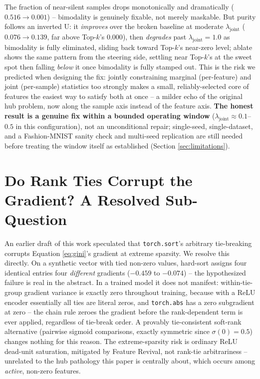 \documentclass[11pt,twocolumn]{article}
\begin{document}
The fraction of near-silent samples drops monotonically and dramatically ($0.516\to0.001$) -- bimodality is genuinely fixable, not merely maskable. But purity follows an inverted U: it \emph{improves} over the broken baseline at moderate $\lambda_{\mathrm{joint}}$ ($0.076\to0.139$, far above Top-$k$'s $0.000$), then \emph{degrades} past $\lambda_{\mathrm{joint}}{=}1.0$ as bimodality is fully eliminated, sliding back toward Top-$k$'s near-zero level; ablate shows the same pattern from the steering side, settling near Top-$k$'s at the sweet spot then falling \emph{below} it once bimodality is fully stamped out. This is the risk we predicted when designing the fix: jointly constraining marginal (per-feature) and joint (per-sample) statistics too strongly makes a small, reliably-selected core of features the easiest way to satisfy both at once -- a milder echo of the original hub problem, now along the sample axis instead of the feature axis. \textbf{The honest result is a genuine fix within a bounded operating window} ($\lambda_{\mathrm{joint}}\approx0.1$--$0.5$ in this configuration), not an unconditional repair; single-seed, single-dataset, and a Fashion-MNIST sanity check and multi-seed replication are still needed before treating the window itself as established (Section \ref{sec:limitations}).

\section{Do Rank Ties Corrupt the Gradient? A Resolved Sub-Question}
\label{sec:tie-analysis}
An earlier draft of this work speculated that \texttt{torch.sort}'s arbitrary tie-breaking corrupts Equation \ref{eq:gini}'s gradient at extreme sparsity. We resolve this directly. On a synthetic vector with tied non-zero values, hard-sort assigns four identical entries four \emph{different} gradients ($-0.459$ to $-0.074$) -- the hypothesized failure is real in the abstract. In a trained model it does not manifest: within-tie-group gradient variance is exactly zero throughout training, because with a ReLU encoder essentially all ties are literal zeros, and \texttt{torch.abs} has a zero subgradient at zero -- the chain rule zeroes the gradient before the rank-dependent term is ever applied, regardless of tie-break order. A provably tie-consistent soft-rank alternative (pairwise sigmoid comparisons, exactly symmetric since $\sigma(0){=}0.5$) changes nothing for this reason. The extreme-sparsity risk is ordinary ReLU dead-unit saturation, mitigated by Feature Revival, not rank-tie arbitrariness -- unrelated to the hub pathology this paper is centrally about, which occurs among \emph{active}, non-zero features.
\end{document}
